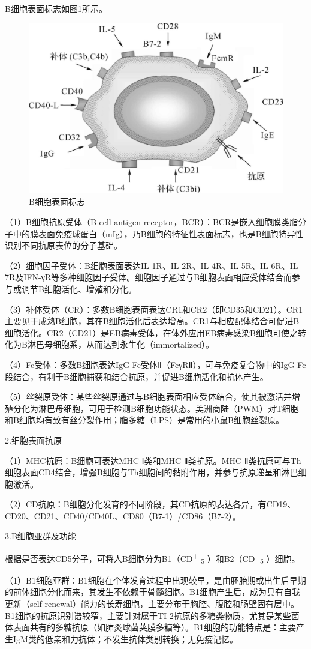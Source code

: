 B细胞表面标志如图\ref{fig2-18}所示。

\begin{figure}[!htbp]
 \centering
 \includegraphics[width=.5\textwidth]{./images/Image00043.jpg}
 \caption{B细胞表面标志}
 \label{fig2-18}
  \end{figure} 

（1）B细胞抗原受体（B-cell antigen
receptor，BCR）：BCR是嵌入细胞膜类脂分子中的膜表面免疫球蛋白（mIg），乃B细胞的特征性表面标志，也是B细胞特异性识别不同抗原表位的分子基础。

（2）细胞因子受体：B细胞表面表达IL-1R、IL-2R、IL-4R、IL-5R、IL-6R、IL-7R及IFN-γR等多种细胞因子受体。细胞因子通过与B细胞表面相应受体结合而参与或调节B细胞活化、增殖和分化。

（3）补体受体（CR）：多数B细胞表面表达CR1和CR2（即CD35和CD21）。CR1主要见于成熟B细胞，其在B细胞活化后表达增高。CR1与相应配体结合可促进B细胞活化。CR2（CD21）是EB病毒受体，在体外应用EB病毒感染B细胞可使之转化为B淋巴母细胞系，从而达到永生化（immortalized）。

（4）Fc受体：多数B细胞表达IgG Fc受体Ⅱ（FcγRⅡ），可与免疫复合物中的IgG
Fc段结合，有利于B细胞捕获和结合抗原，并促进B细胞活化和抗体产生。

（5）丝裂原受体：某些丝裂原通过与B细胞表面相应受体结合，使其被激活并增殖分化为淋巴母细胞，可用于检测B细胞功能状态。美洲商陆（PWM）对T细胞和B细胞均有致有丝分裂作用；脂多糖（LPS）是常用的小鼠B细胞丝裂原。

2.细胞表面抗原

（1）MHC抗原：B细胞可表达MHC-Ⅰ类和MHC-Ⅱ类抗原。MHC-Ⅱ类抗原可与Th细胞表面CD4结合，增强B细胞与Th细胞间的黏附作用，并参与抗原递呈和淋巴细胞激活。

（2）CD抗原：B细胞分化发育的不同阶段，其CD抗原的表达各异，有CD19、CD20、CD21、CD40/CD40L、CD80（B7-1）/CD86（B7-2）。

3.B细胞亚群及功能

根据是否表达CD5分子，可将人B细胞分为B1（CD\textsuperscript{+}
\textsubscript{5} ）和B2（CD\textsuperscript{-} \textsubscript{5}
）细胞。

（1）B1细胞亚群：B1细胞在个体发育过程中出现较早，是由胚胎期或出生后早期的前体细胞分化而来，其发生不依赖于骨髓细胞。B1细胞产生后，成为具有自我更新（self-renewal）能力的长寿细胞，主要分布于胸腔、腹腔和肠壁固有层中。B1细胞的抗原识别谱较窄，主要针对属于TI-2抗原的多糖类物质，尤其是某些菌体表面共有的多糖抗原（如肺炎球菌荚膜多糖等）。B1细胞的功能特点是：主要产生IgM类的低亲和力抗体；不发生抗体类别转换；无免疫记忆。

